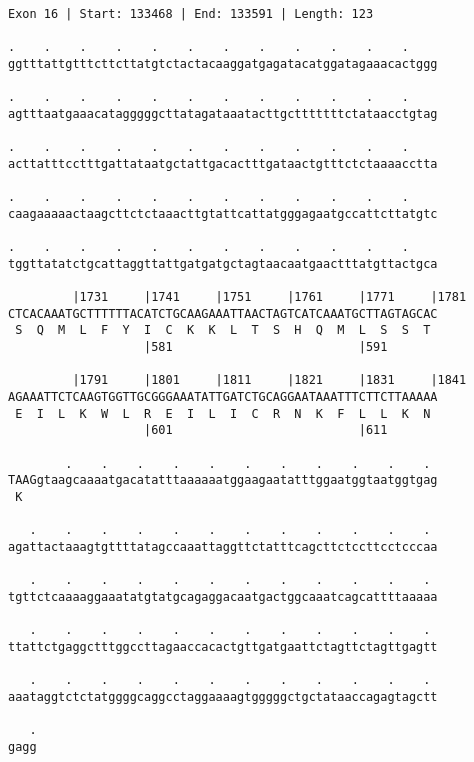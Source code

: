 \documentclass{article}
\begin{document}
\begin{Verbatim}
Exon 16 | Start: 133468 | End: 133591 | Length: 123
 
.    .    .    .    .    .    .    .    .    .    .    .    
ggtttattgtttcttcttatgtctactacaaggatgagatacatggatagaaacactggg
  
.    .    .    .    .    .    .    .    .    .    .    .    
agtttaatgaaacatagggggcttatagataaatacttgctttttttctataacctgtag
  
.    .    .    .    .    .    .    .    .    .    .    .    
acttatttcctttgattataatgctattgacactttgataactgtttctctaaaacctta
  
.    .    .    .    .    .    .    .    .    .    .    .    
caagaaaaactaagcttctctaaacttgtattcattatgggagaatgccattcttatgtc
  
.    .    .    .    .    .    .    .    .    .    .    .    
tggttatatctgcattaggttattgatgatgctagtaacaatgaactttatgttactgca
  
         |1731     |1741     |1751     |1761     |1771     |1781
CTCACAAATGCTTTTTTACATCTGCAAGAAATTAACTAGTCATCAAATGCTTAGTAGCAC
 S  Q  M  L  F  Y  I  C  K  K  L  T  S  H  Q  M  L  S  S  T 
                   |581                          |591       
  
         |1791     |1801     |1811     |1821     |1831     |1841
AGAAATTCTCAAGTGGTTGCGGGAAATATTGATCTGCAGGAATAAATTTCTTCTTAAAAA
 E  I  L  K  W  L  R  E  I  L  I  C  R  N  K  F  L  L  K  N 
                   |601                          |611       
  
        .    .    .    .    .    .    .    .    .    .    . 
TAAGgtaagcaaaatgacatatttaaaaaatggaagaatatttggaatggtaatggtgag
 K                                                          
  
   .    .    .    .    .    .    .    .    .    .    .    . 
agattactaaagtgttttatagccaaattaggttctatttcagcttctccttcctcccaa
  
   .    .    .    .    .    .    .    .    .    .    .    . 
tgttctcaaaaggaaatatgtatgcagaggacaatgactggcaaatcagcattttaaaaa
  
   .    .    .    .    .    .    .    .    .    .    .    . 
ttattctgaggctttggccttagaaccacactgttgatgaattctagttctagttgagtt
  
   .    .    .    .    .    .    .    .    .    .    .    . 
aaataggtctctatggggcaggcctaggaaaagtgggggctgctataaccagagtagctt
  
   .
gagg
\end{Verbatim}
\newpage
\end{document}
